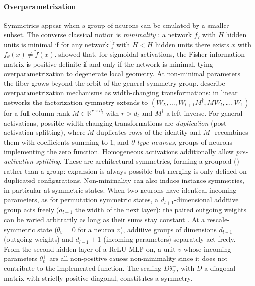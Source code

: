 \documentclass[mathematics,review,submit,moreauthors]{Definitions/mdpi}
\begin{document}
\paragraph{Overparametrization}
Symmetries appear when a group of neurons can be emulated by a smaller subset.
The converse classical notion is \emph{minimality} \citep{sussmann1992nn,fukumizu1996nn,brea2019,simsek2021,grillo2026,gegenfurtner2026}: a network $f_\theta$ with $H$ hidden units is minimal if for any network $\tilde f$ with $\tilde{H}<H$ hidden units there exists $x$ with $f_\theta(x)\neq \tilde f(x)$.
\citet{fukumizu1996nn} showed that, for sigmoidal activations, the Fisher information matrix is positive definite if and only if the network is minimal, tying overparametrization to degenerate local geometry.
At non-minimal parameters the fiber grows beyond the orbit of the general symmetry group.
\citet{sareen2026} describe overparametrization mechanisms as width-changing transformations: in linear networks the factorization symmetry extends to $(W_L,\dots,W_{l+1}M^{\dagger},MW_l,\dots,W_1)$ for a full-column-rank $M\in\mathbb{R}^{r\times d_l}$ with $r>d_l$ and $M^{\dagger}$ a left inverse.
For general activations, possible width-changing transformations are \emph{duplication} (post-activation splitting), where $M$ duplicates rows of the identity and $M^{\dagger}$ recombines them with coefficients summing to $1$, and \emph{0-type neurons}, groups of neurons implementing the zero function.
Homogeneous activations additionally allow \emph{pre-activation splitting}.
These are architectural symmetries, forming a groupoid () rather than a group: expansion is always possible but merging is only defined on duplicated configurations.
Non-minimality can also induce instance symmetries, in particular at symmetric states.
When two neurons have identical incoming parameters, as for permutation symmetric states, a $d_{l+1}$-dimensional additive group acts freely ($d_{l+1}$ the width of the next layer): the paired outgoing weights can be varied arbitrarily as long as their sums stay constant \citep{brea2019}.
At a rescale-symmetric state ($\theta_v=0$ for a neuron $v$), additive groups of dimensions $d_{l+1}$ (outgoing weights) and $d_{l-1}+1$ (incoming parameters) separately act freely.
From the second hidden layer of a ReLU MLP on, a unit $v$ whose incoming parameters $\theta^+_v$ are all non-positive causes non-minimality since it does not contribute to the implemented function.
The scaling $D\theta^+_v$, with $D$ a diagonal matrix with strictly positive diagonal, constitutes a symmetry.
\end{document}
